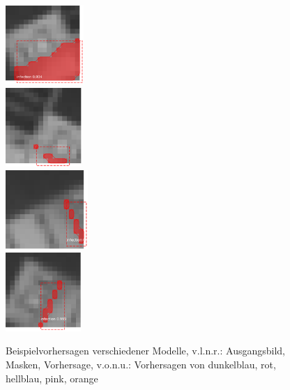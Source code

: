 \begin{figure}[H]
\begin{minipage}[c]{.3\textwidth}
  \\ \vspace{.25cm}
  \includegraphics[height=3cm]{pics/pred-3-3.png}
  \\ \vspace{.25cm}
  \includegraphics[height=3cm]{pics/pred-3-4.png}
  \\ \vspace{.25cm}
  \includegraphics[height=3cm]{pics/pred-3-5.png}
  \\ \vspace{.25cm}
  \includegraphics[height=3cm]{pics/pred-3-1.png}
  \end{minipage}

  \caption[Beispielvorhersagen Experiment 2]{Beispielvorhersagen verschiedener Modelle, v.l.n.r.: Ausgangsbild, Masken, Vorhersage, v.o.n.u.: Vorhersagen von dunkelblau, rot, hellblau, pink, orange}
  \label{fig:pred-3}
\end{figure}
\noindent
